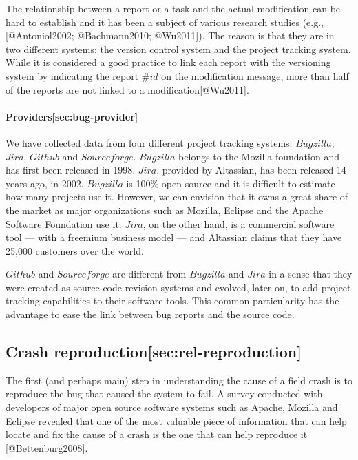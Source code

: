 The relationship between a report or a task and the actual modification
can be hard to establish and it has been a subject of various research
studies (e.g., {[}@Antoniol2002; @Bachmann2010; @Wu2011{]}). The reason
is that they are in two different systems: the version control system
and the project tracking system. While it is considered a good practice
to link each report with the versioning system by indicating the report
\(\#id\) on the modification message, more than half of the reports are
not linked to a modification{[}@Wu2011{]}.

\paragraph{Providers{[}sec:bug-provider{]}}\label{providerssecbug-provider}

We have collected data from four different project tracking systems:
\(Bugzilla\), \(Jira\), \(Github\) and \(Sourceforge\). \(Bugzilla\)
belongs to the Mozilla foundation and has first been released in 1998.
\(Jira\), provided by Altassian, has been released 14 years ago, in
2002. \(Bugzilla\) is 100\% open source and it is difficult to estimate
how many projects use it. However, we can envision that it owns a great
share of the market as major organizations such as Mozilla, Eclipse and
the Apache Software Foundation use it. \(Jira\), on the other hand, is a
commercial software tool --- with a freemium business model --- and
Altassian claims that they have 25,000 customers over the world.

\(Github\) and \(Sourceforge\) are different from \(Bugzilla\) and
\(Jira\) in a sense that they were created as source code revision
systems and evolved, later on, to add project tracking capabilities to
their software tools. This common particularity has the advantage to
ease the link between bug reports and the source code.

\subsection{Crash
reproduction{[}sec:rel-reproduction{]}}\label{crash-reproductionsecrel-reproduction}

The first (and perhaps main) step in understanding the cause of a field
crash is to reproduce the bug that caused the system to fail. A survey
conducted with developers of major open source software systems such as
Apache, Mozilla and Eclipse revealed that one of the most valuable piece
of information that can help locate and fix the cause of a crash is the
one that can help reproduce it {[}@Bettenburg2008{]}.

